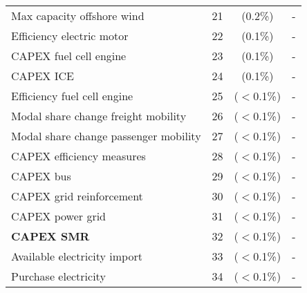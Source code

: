 \begin{table}[htbp!]
\begin{tabular}{l c c| c c}
Max capacity offshore wind & 21 & (0.2\%) & \multicolumn{2}{c}{-} \\
Efficiency electric motor & 22 & (0.1\%) & \multicolumn{2}{c}{-} \\
CAPEX fuel cell engine & 23 & (0.1\%) & \multicolumn{2}{c}{-} \\
CAPEX ICE & 24 & (0.1\%) & \multicolumn{2}{c}{-} \\
Efficiency fuel cell engine & 25 & ($<$0.1\%) & \multicolumn{2}{c}{-} \\
Modal share change freight mobility & 26 & ($<$0.1\%) & \multicolumn{2}{c}{-} \\
Modal share change passenger mobility & 27 & ($<$0.1\%) & \multicolumn{2}{c}{-} \\
CAPEX efficiency measures & 28 & ($<$0.1\%) & \multicolumn{2}{c}{-} \\
CAPEX bus & 29 & ($<$0.1\%) & \multicolumn{2}{c}{-} \\
CAPEX grid reinforcement & 30 & ($<$0.1\%) & \multicolumn{2}{c}{-} \\
CAPEX power grid & 31 & ($<$0.1\%) & \multicolumn{2}{c}{-} \\
\textbf{CAPEX \gls{SMR}} & 32 & ($<$0.1\%) & \multicolumn{2}{c}{-} \\
Available electricity import & 33 & ($<$0.1\%) & \multicolumn{2}{c}{-} \\
Purchase electricity & 34 & ($<$0.1\%) & \multicolumn{2}{c}{-} \\
\bottomrule							

\end{tabular}
\end{table}

